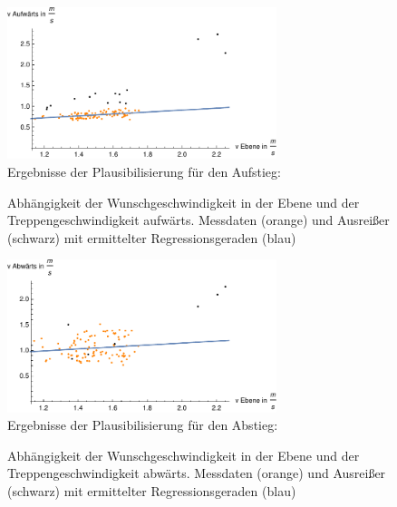 	\begin{figure}[htpb]
		\centering
		\includegraphics[width=0.7\textwidth]{abbildungen/regression/2012_2017_verbund/ohneausreisser/auf-ebene.pdf}
		\justify \ \\
		Ergebnisse der Plausibilisierung für den Aufstieg:
		
		\caption{Abhängigkeit der Wunschgeschwindigkeit in der Ebene und der Treppengeschwindigkeit aufwärts. Messdaten (orange) und Ausreißer (schwarz) mit ermittelter Regressionsgeraden (blau)}
		\label{fig:2012_und_2017_OA_auf_ebene}
	\end{figure}
	
	\begin{figure}[htpb]
		\centering
		\includegraphics[width=0.7\textwidth]{abbildungen/regression/2012_2017_verbund/ohneausreisser/ab-ebene.pdf}
		\justify \ \\
		Ergebnisse der Plausibilisierung für den Abstieg:
		
		\caption{Abhängigkeit der Wunschgeschwindigkeit in der Ebene und der Treppengeschwindigkeit abwärts. Messdaten (orange) und Ausreißer (schwarz) mit ermittelter Regressionsgeraden (blau)}
		\label{fig:2012_und_2017_OA_ab_ebene}
	\end{figure}
	
	
	
	
	
	
	
	
	
